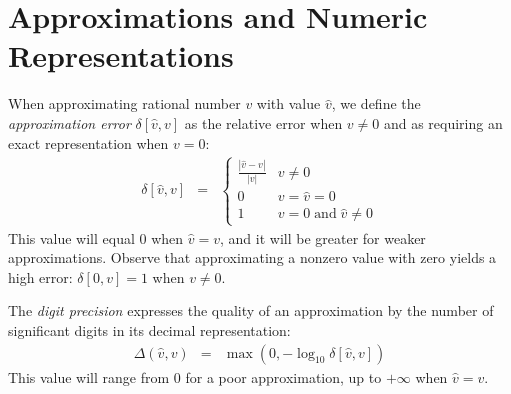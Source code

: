 \documentclass[letterpaper,USenglish,cleveref, autoref, thm-restate]{lipics-v2021}
\newcommand{\approximate}[1]{\hat{#1}}
\newcommand{\approxv}{\approximate{v}}
\newcommand{\aerror}{\delta}
\newcommand{\digitprecision}{\Delta}
\begin{document}
\section{Approximations and Numeric Representations}
\label{sect:background:numbers}

When approximating rational number $v$ with value $\approxv$, we
define the \emph{approximation error} $\aerror[\approxv, v]$
as the relative error when $v \not = 0$ and as requiring an exact representation when $v = 0$:
\begin{eqnarray}
\aerror[\approxv, v] & = & \left\{ \begin{array}{ll}
  \frac{|\approxv - v|}{|v|}  & v \not = 0\\
  0 & v  = \approxv = 0\\
  1 & v = 0 \; \textrm{and} \; \approxv \not = 0
  \end{array} \right. \label{eqn:approx:error}
\end{eqnarray}
This value will equal 0 when $\approxv=v$, and it will be greater for weaker approximations.
Observe that approximating a nonzero value with zero yields a high error:  $\aerror[0, v] = 1$ when $v\not=0$.

The \emph{digit precision} expresses the quality of an approximation by the number of significant digits in its decimal representation:
\begin{eqnarray}
\digitprecision(\approxv, v) & = & \max(0, -\log_{10} \aerror[\approxv, v]) \label{eqn:digitprecision} 
\end{eqnarray}
This value will range from $0$ for a poor approximation, up to $+\infty$ when $\approxv=v$.
\end{document}
